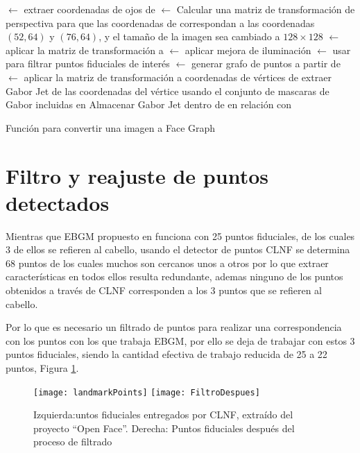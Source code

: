 \begin{algorithm}
\;
{
 $\gets$ extraer coordenadas de ojos de \;
 $\gets$ Calcular una matriz de transformación de perspectiva para que las coordenadas de  correspondan a las coordenadas $(52,64)$ y $(76,64)$,  y el tamaño de la imagen sea cambiado a $128 \times 128$\;
 $\gets$ aplicar la matriz de transformación  a \;
 $\gets$ aplicar mejora de iluminación\;
 $\gets$ usar  para filtrar puntos fiduciales de interés\;
 $\gets$ generar grafo de puntos a partir de \;
 $\gets$ aplicar la matriz de transformación  a coordenadas de vértices de \;
{
	extraer Gabor Jet de las coordenadas del vértice usando el conjunto de mascaras de Gabor incluidas en \;
    Almacenar Gabor Jet dentro de  en relación con \;
}
\Return {}\;
}

\caption{Función para convertir una imagen a Face Graph}
\label{alg:ImToGrph}
\end{algorithm}

\section{Filtro y reajuste de puntos detectados}
Mientras que \ac{EBGM} propuesto en \cite{bolme2003elastic} funciona con 25 puntos fiduciales, de los cuales 3 de ellos se refieren al cabello, usando el detector de puntos \ac{CLNF} se determina 68 puntos de los cuales muchos son cercanos unos a otros por lo que extraer características en todos ellos resulta redundante, ademas ninguno de los puntos obtenidos a través de \ac{CLNF} corresponden a los 3 puntos que se refieren al cabello.

Por lo que es necesario un filtrado de puntos para realizar una correspondencia con los puntos con los que trabaja \ac{EBGM}, por ello se deja de trabajar con estos 3 puntos fiduciales, siendo la cantidad efectiva de trabajo reducida de 25 a 22 puntos, Figura \ref{im:22Landmark}.

\begin{figure}[h]
\center
\texttt{[image: landmarkPoints]}
\texttt{[image: FiltroDespues]}
\caption{Izquierda:untos fiduciales entregados por \ac{CLNF}, extraído del proyecto ``Open Face''. Derecha: Puntos fiduciales después del proceso de filtrado}
\label{im:22Landmark}
\end{figure}

